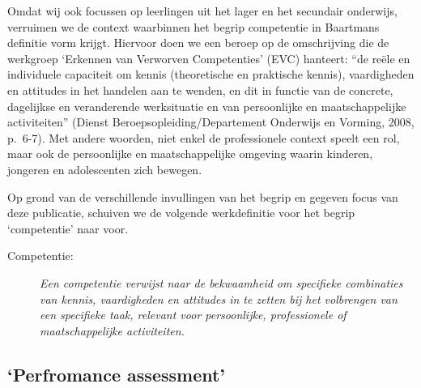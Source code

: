 \documentclass[
  letterpaper,
]{report}
\begin{document}
Omdat wij ook focussen op leerlingen uit het lager en het secundair
onderwijs, verruimen we de context waarbinnen het begrip competentie in
Baartmans definitie vorm krijgt. Hiervoor doen we een beroep op de
omschrijving die de werkgroep `Erkennen van Verworven Competenties'
(EVC) hanteert: ``de reële en individuele capaciteit om kennis
(theoretische en praktische kennis), vaardigheden en attitudes in het
handelen aan te wenden, en dit in functie van de concrete, dagelijkse en
veranderende werksituatie en van persoonlijke en maatschappelijke
activiteiten'' (Dienst Beroepsopleiding/Departement Onderwijs en
Vorming, 2008, p.~6-7). Met andere woorden, niet enkel de professionele
context speelt een rol, maar ook de persoonlijke en maatschappelijke
omgeving waarin kinderen, jongeren en adolescenten zich bewegen.

Op grond van de verschillende invullingen van het begrip en gegeven
focus van deze publicatie, schuiven we de volgende werkdefinitie voor
het begrip `competentie' naar voor.

\begin{description}
\item[Competentie:]
\emph{Een competentie verwijst naar de bekwaamheid om specifieke
combinaties van kennis, vaardigheden en attitudes in te zetten bij het
volbrengen van een specifieke taak, relevant voor persoonlijke,
professionele of maatschappelijke activiteiten.}
\end{description}

\hypertarget{perfromance-assessment}{%
\subsection{`Perfromance assessment'}\label{perfromance-assessment}}
\end{document}
